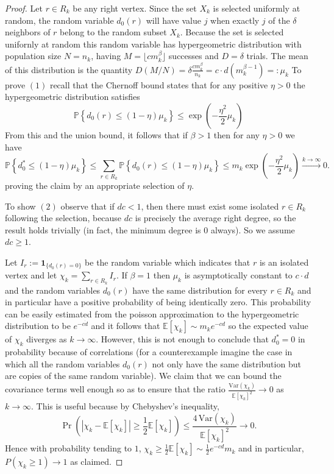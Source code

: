 \documentclass[12pt]{amsart}
\theoremstyle{definition}
\renewcommand{\geq}{\geqslant}
\renewcommand{\leq}{\leqslant}
\newcommand{\PP}{\ensuremath{\mathbb{P}}}
\newcommand{\EE}{\ensuremath{\mathbb{E}}}
\newcommand{\1}{\ensuremath{\mathbb{1}}}
\begin{document}
\begin{proof} Let $r\in R_k$ be any right vertex. Since the set $X_k$ is selected uniformly at random, the random variable $d_0(r)$ will have value $j$ when exactly $j$ of the $\delta$ neighbors of $r$ belong to the random subset $X_k$. Because the set is selected unifornly at random this random variable has hypergeometric distribution with population size $N=n_k$, having $M=\lfloor cm_k^\beta\rfloor$ successes and $D=\delta$ trials. The mean of this distribution is the quantity $D(M/N) = \delta \frac{cm_k^{\beta}}{n_k}=c\cdot d (m_k^{\beta-1})=:\mu_k$
To prove $(1)$ recall that the Chernoff bound states that for any positive $\eta>0$ the hypergeometric distribution satisfies  
\[\PP\left\{d_0(r)\leq (1-\eta)\mu_k\right\}\leq \exp\left(-\frac{\eta^2}{2}\mu_k\right)\]
From this and the union bound, it follows that if $\beta>1$ then for any $\eta>0$ we have
\[
\mathbb{P}\!\left\{d_0^*\le (1-\eta)\mu_k\right\}
\le \sum_{r\in R_k}\mathbb{P}\!\left\{d_0(r)\le (1-\eta)\mu_k\right\}
\le m_k \exp\!\left(-\frac{\eta^2}{2}\mu_k\right)
\xrightarrow{k\to\infty} 0.
\]
proving the claim by an appropriate selection of $\eta$.


To show $(2)$ observe that if $dc<1$, then there must exist some isolated $r \in R_k$ following the selection, because $dc$ is precisely the average right degree, so the result holds trivially (in fact, the minimum degree is $0$ always). So we assume $dc \geq 1$.

Let $I_r := \mathbf{1}_{\{d_0(r)=0\}}$ be the random variable which indicates that $r$ is an isolated vertex and let $\chi_k = \sum_{r \in R_k} I_r$. If $\beta=1$ then $\mu_k$ is asymptotically constant to $c\cdot d$ and the random variables $d_0(r)$ have the same distribution for every $r\in R_k$ and in particular have a positive probability of being identically zero. This probability can be easily estimated from the poisson approximation to the hypergeometric distribution to be $e^{-c\dot d}$ and it follows that $\EE[\chi_k]\sim m_ke^{-cd}$ so the expected value of $\chi_k$ diverges as $k\rightarrow \infty$. However, this is not enough to conclude that $d_0^*=0$ in probability because of correlations (for a counterexample imagine the case in which all the random variables $d_0(r)$ not only have the same distribution but are copies of the same random variable). 
We claim that we can bound the covariance terms well enough so as to ensure that the ratio $\frac{\mathrm{Var}(\chi_k)}{\EE[\chi_k]^2}\rightarrow 0$ as $k\rightarrow \infty$. This is useful because by Chebyshev's inequality,
\[
\Pr\!\left(
\left|\chi_k - \EE[\chi_k]\right|
\ge \frac12 \EE[\chi_k]
\right)
\le
\frac{4\,\mathrm{Var}(\chi_k)}
     {\EE[\chi_k]^2}
\to 0.
\]
Hence with probability tending to $1$,
$\chi_k \ge \frac12 \EE[\chi_k]
\sim \frac12 e^{-cd} m_k$ and in particular,
$P(\chi_k \ge 1) \to 1$ as claimed. 


\end{proof}
\end{document}
